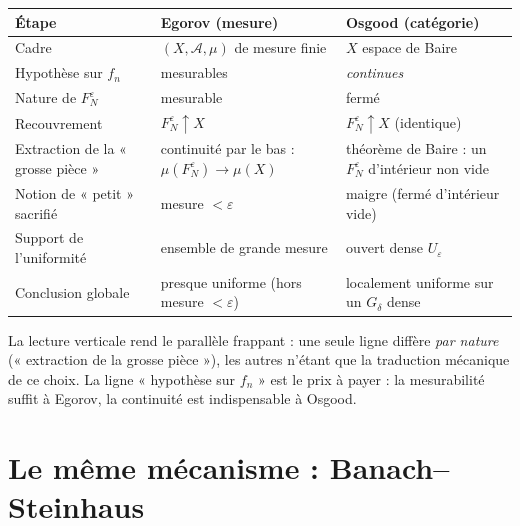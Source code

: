\documentclass[11pt,a4paper]{article}
\theoremstyle{plain}
\theoremstyle{definition}
\newcommand{\A}{\mathcal{A}}
\newcommand{\1}{\mathbf{1}}
\begin{document}
\renewcommand{\arraystretch}{1.5}
\begin{center}
\begin{tabular}{@{}>{\raggedright\arraybackslash}p{}
                   >{\raggedright\arraybackslash}p{}
                   >{\raggedright\arraybackslash}p{}@{}}
\toprule
\textbf{Étape} & \textbf{Egorov (mesure)} & \textbf{Osgood (catégorie)}\\
\midrule
Cadre &
$(X,\A,\mu)$ de mesure finie &
$X$ espace de Baire\\

Hypothèse sur $f_n$ &
mesurables &
\emph{continues}\\

Nature de $F_N^{\varepsilon}$ &
mesurable &
fermé\\

Recouvrement &
$F_N^{\varepsilon}\uparrow X$ &
$F_N^{\varepsilon}\uparrow X$ \newline (identique)\\

Extraction de la « grosse pièce » &
continuité par le bas : \newline $\mu(F_N^{\varepsilon})\to\mu(X)$ &
théorème de Baire : \newline un $F_N^{\varepsilon}$ d'intérieur non vide\\

Notion de « petit » sacrifié &
mesure $<\varepsilon$ &
maigre (fermé d'intérieur vide)\\

Support de l'uniformité &
ensemble de grande mesure &
ouvert dense $U_\varepsilon$\\

Conclusion globale &
presque uniforme \newline (hors mesure $<\varepsilon$) &
localement uniforme \newline sur un $G_\delta$ dense\\
\bottomrule
\end{tabular}
\end{center}
\renewcommand{\arraystretch}{1}

\medskip
La lecture verticale rend le parallèle frappant : une seule ligne diffère
\emph{par nature} (« extraction de la grosse pièce »), les autres n'étant que la
traduction mécanique de ce choix. La ligne « hypothèse sur $f_n$ » est le prix à
payer : la mesurabilité suffit à Egorov, la continuité est indispensable à Osgood.

\section{Le même mécanisme : Banach--Steinhaus}
\end{document}
